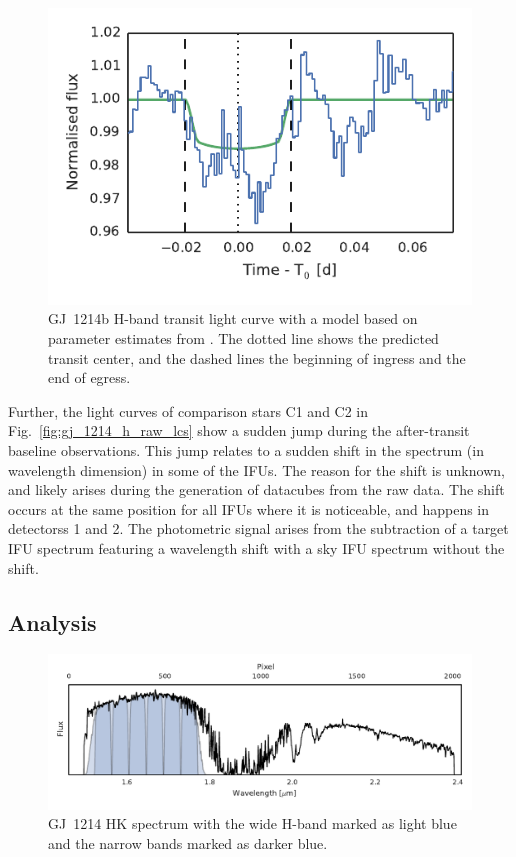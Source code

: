 \documentclass[useAMS,usenatbib]{mn2e}
\begin{document}
\begin{figure}
 \centering
 \includegraphics[width=\columnwidth]{gj_1214_h_lc.pdf}
 \caption{GJ~1214b H-band transit light curve with a model based on parameter estimates from \citet{Kreidberg2013}. The 
dotted line shows the predicted transit center, and the dashed lines the beginning of ingress and the end of egress.}
 \label{fig:gj_1214_lc_h}
\end{figure}

Further, the light curves of comparison stars C1 and C2 in Fig.~\ref{fig:gj_1214_h_raw_lcs} show a sudden jump during 
the after-transit baseline observations. This jump relates to a sudden shift in the spectrum (in wavelength dimension) 
in some of the IFUs. The reason for the shift is unknown, and likely arises during the generation of datacubes from 
the raw data. The shift occurs at the same position for all IFUs where it is noticeable, and happens  in detectorss 1
and 2. The photometric signal arises from the subtraction of a target IFU spectrum featuring a wavelength shift with a
sky IFU spectrum without the shift.

\subsection{Analysis}
\label{sec:gj_1214b:analysis}

\begin{figure}[t!]
 \centering
 \includegraphics[width=\textwidth]{gj_1214_spectrum_h.pdf}
 \caption{GJ~1214 HK spectrum with the wide H-band marked as light blue and the narrow bands marked as darker blue.}
 \label{fig:gj_1214_spectrum_h}
\end{figure}
\end{document}
